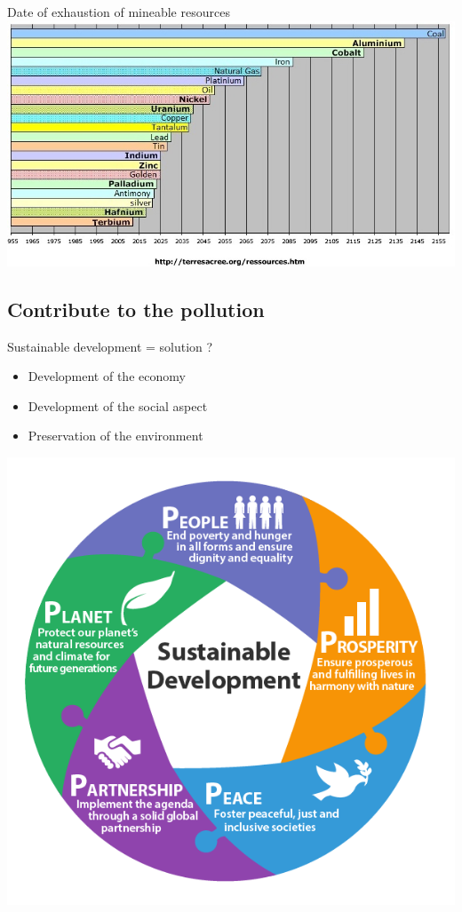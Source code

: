 \documentclass{beamer}
\begin{document}
\begin{frame}

\begin{block}{Date of exhaustion of mineable resources} 
\includegraphics[scale=0.40]{pics/image2.jpg}
\end{block}

\end{frame}

\subsection{Contribute to the pollution}

 \begin{frame}
\begin{block}{Sustainable development = solution ?} 
	\begin{itemize}
		[circle]
		\item Development of the economy
		\item Development of the social aspect
		\item Preservation of the environment
	\end{itemize}
	\hspace{2.5cm}
	\includegraphics[scale=0.2]{pics/image3.png}
\end{block}
\end{frame}
\end{document}
